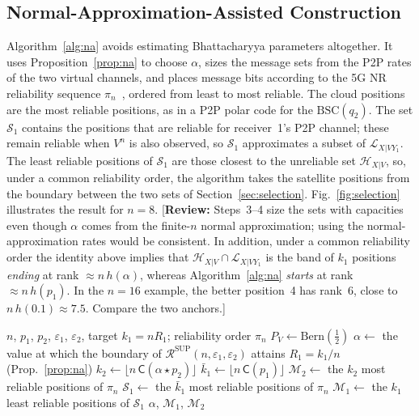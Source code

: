 \documentclass[conference]{IEEEtran}
\newcommand{\Csf}{\mathsf{C}}
\newcommand{\Hs}{\mathcal{H}}
\newcommand{\Ls}{\mathcal{L}}
\newcommand{\Ms}{\mathcal{M}}
\newcommand{\Rs}{\mathcal{R}}
\newcommand{\Bern}{\mathrm{Bern}}
\newcommand{\BSC}{\mathrm{BSC}}
\newcommand{\reviewnote}[1]{{\color{red}\footnotesize[\textbf{Review:} #1]}}
\begin{document}
\subsection{Normal-Approximation-Assisted Construction}
\label{sec:proposed}
Algorithm~\ref{alg:na} avoids estimating Bhattacharyya parameters altogether. It uses Proposition~\ref{prop:na} to choose $\alpha$, sizes the message sets from the P2P rates of the two virtual channels, and places message bits according to the 5G NR reliability sequence $\pi_n$~\cite{3gpp38212,bioglio2021}, ordered from least to most reliable. The cloud positions are the most reliable positions, as in a P2P polar code for the $\BSC(q_2)$. The set $\mathcal{S}_1$ contains the positions that are reliable for receiver~1's P2P channel; these remain reliable when $V^n$ is also observed, so $\mathcal{S}_1$ approximates a subset of $\Ls_{X|VY_1}$. The least reliable positions of $\mathcal{S}_1$ are those closest to the unreliable set $\Hs_{X|V}$, so, under a common reliability order, the algorithm takes the satellite positions from the boundary between the two sets of Section~\ref{sec:selection}. Fig.~\ref{fig:selection} illustrates the result for $n=8$. \reviewnote{Steps~3--4 size the sets with capacities even though $\alpha$ comes from the finite-$n$ normal approximation; using the normal-approximation rates would be consistent. In addition, under a common reliability order the identity above implies that $\Hs_{X|V}\cap\Ls_{X|VY_1}$ is the band of $k_1$ positions \emph{ending} at rank $\approx n\,h(\alpha)$, whereas Algorithm~\ref{alg:na} \emph{starts} at rank $\approx n\,h(p_1)$. In the $n=16$ example, the better position~4 has rank~6, close to $n\,h(0.1)\approx7.5$. Compare the two anchors.}

\begin{algorithm}[t]
\caption{Normal-approximation-assisted selection}
\label{alg:na}
\begin{algorithmic}[1]
\REQUIRE $n$, $p_1$, $p_2$, $\varepsilon_1$, $\varepsilon_2$, target $k_1=nR_1$; reliability order $\pi_n$
\STATE $P_V\gets\Bern(\frac12)$
\STATE $\alpha\gets$ the value at which the boundary of $\Rs^{\mathrm{SUP}}(n,\varepsilon_1,\varepsilon_2)$ attains $R_1=k_1/n$ (Prop.~\ref{prop:na})
\STATE $k_2\gets\lfloor n\,\Csf(\alpha\star p_2)\rfloor$
\STATE $\bar k_1\gets\lfloor n\,\Csf(p_1)\rfloor$
\STATE $\Ms_2\gets$ the $k_2$ most reliable positions of $\pi_n$
\STATE $\mathcal{S}_1\gets$ the $\bar k_1$ most reliable positions of $\pi_n$
\STATE $\Ms_1\gets$ the $k_1$ least reliable positions of $\mathcal{S}_1$
\RETURN $\alpha$, $\Ms_1$, $\Ms_2$
\end{algorithmic}
\end{algorithm}
\end{document}
